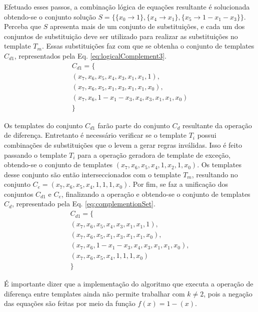 Efetuado esses passos, a combinação lógica de equações resultante é solucionada obtendo-se o conjunto solução $S = \{\{x_0 \to 1\}, \{x_4 \to x_1\}, \{x_5 \to 1 - x_1 - x_3\}\}$. Perceba que $S$ apresenta mais de um conjunto de substituições, e cada um dos conjuntos de substituição deve ser utilizado para realizar as substituições no template $T_m$. Essas substituições faz com que se obtenha o conjunto de templates $C_{d1}$, representados pela Eq. \eqref{eq:logicalComplement3}. 
\begin{equation}
\begin{split}
C_{d1} = \{\\(x_7, x_6, x_5, x_4, x_3, x_1, x_1, 1), \\(x_7, x_6, x_5, x_1, x_3, x_1, x_1, x_0), \\(x_7, x_6, 1 - x_1 - x_3, x_4, x_3, x_1, x_1, x_0)\\\}
\end{split}
\label{eq:logicalComplement3}
\end{equation}

Os templates do conjunto $C_{d1}$ farão parte do conjunto $C_d$ resultante da operação de diferença. Entretanto é necessário verificar se o template $T_i$ possui combinações de substituições que o levem a gerar regras inválidas. Isso é feito passando o template $T_i$ para a operação geradora de template de exceção, obtendo-se o conjunto de templates ${(x_7, x_6, x_5, x_4, 1, x_2, 1, x_0)}$. Os templates desse conjunto são então interseccionados com o template $T_m$, resultando no conjunto $C_e = {(x_7, x_6, x_5, x_4, 1, 1, 1, x_0)}$. Por fim, se faz a unificação dos conjuntos $C_{d1}$ e $C_e$, finalizando a operação e obtendo-se o conjunto de templates $C_d$, representado pela Eq. \ref{eq:complementionSet}.
\begin{equation}
\begin{split}
C_{d1} = \{\\(x_7, x_6, x_5, x_4, x_3, x_1, x_1, 1), \\(x_7, x_6, x_5, x_1, x_3, x_1, x_1, x_0), \\(x_7, x_6, 1 - x_1 - x_3, x_4, x_3, x_1, x_1, x_0), \\(x_7, x_6, x_5, x_4, 1, 1, 1, x_0)\\\}
\label{eq:complementionSet}
\end{split}
\end{equation}

É importante dizer que a implementação do algoritmo que executa a operação de diferença entre templates ainda não permite trabalhar com $k\neq 2$, pois a negação das equações são feitas por meio da função $f(x) = 1 - (x)$. 

